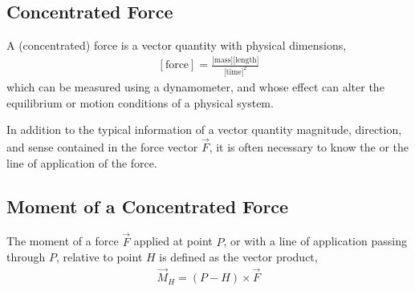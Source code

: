 \documentclass[letterpaper,10pt,english]{jupyterBook}
\begin{document}
\subsection{Concentrated Force}
\label{\detokenize{ch/actions-types:concentrated-force}}
\sphinxAtStartPar
A (concentrated) force is a vector quantity with physical dimensions,
\begin{equation*}
\begin{split}[\text{force}] = \frac{\text{[mass]}\text{[length]}}{\text{[time]}^2}\end{split}
\end{equation*}
\sphinxAtStartPar
which can be measured using a dynamometer, and whose effect can alter the equilibrium or motion conditions of a physical system.

\sphinxAtStartPar
In addition to the typical information of a vector quantity \sphinxhyphen{} magnitude, direction, and sense \sphinxhyphen{} contained in the force vector \(\vec{F}\), it is often necessary to know the  or the line of application of the force.


\subsection{Moment of a Concentrated Force}
\label{\detokenize{ch/actions-types:moment-of-a-concentrated-force}}
\sphinxAtStartPar
The moment of a force \(\vec{F}\) applied at point \(P\), or with a line of application passing through \(P\), relative to point \(H\) is defined as the vector product,
\begin{equation*}
\begin{split}\vec{M}_H = (P - H) \times \vec{F}\end{split}
\end{equation*}
\end{document}
